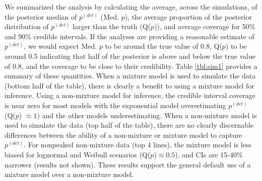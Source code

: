 \documentclass[12pt]{article}
\newcommand{\pdet}{p^{(det)}}
\begin{document}
We summarized the analysis by calculating the average, across the simulations, of the posterior median of $\pdet$ (Med. $p$), the average proportion of the posterior distribution of $\pdet$ larger than the truth (Q($p$)), and average coverage for 50\% and 90\% credible intervals. If the analyses are providing a reasonable estimate of $\pdet$, we would expect Med. $p$ to be around the true value of 0.8, Q($p$) to be around 0.5 indicating that half of the posterior is above and below the true value of 0.8, and the coverage to be close to their credibility. Table \ref{tbl:sim1} provides a summary of these quantities. 
When a mixture model is used to simulate the data (bottom half of the table), there is clearly a benefit to using a mixture model for inference.  
Using a non-mixture model for inference, the credible interval coverage is near zero for most models with the exponential model overestimating $\pdet$ (Q($p$) $\approx 1$) and the other models underestimating. 
When a non-mixture model is used to simulate the data (top half of the table), there are no clearly discernable differences between the ability of a non-mixture or mixture model to capture $\pdet$. 
For nonpeaked non-mixture data (top 4 lines), the mixture model is less biased for lognormal and Weibull scenarios (Q($p$)$\approx 0.5$), and CIs are 15-40\% narrower (results not shown).
These results support the general default use of a mixture model over a non-mixture model.
\end{document}
